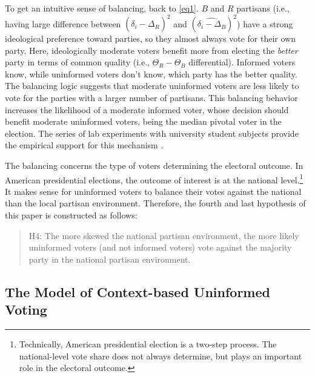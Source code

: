 \documentclass[letterpaper, 12pt]{article}
\begin{document}
    \par To get an intuitive sense of balancing, back to \autoref{eq1}. $B$ and $R$ partisans (i.e., having large difference between $\left(\widehat{\delta_i-\Delta_{R}}\right)^2$ and $\left(\widehat{\delta_i-\Delta_{B}}\right)^2$) have a strong ideological preference toward parties, so they almost always vote for their own party. Here, ideologically moderate voters benefit more from electing the \textit{better} party in terms of common quality (i.e., $\Theta_{R} - \Theta_{B}$ differential). Informed voters know, while uninformed voters don't know, which party has the better quality. The balancing logic suggests that moderate uninformed voters are less likely to vote for the parties with a larger number of partisans. This balancing behavior increases the likelihood of a moderate informed voter, whose decision should benefit moderate uninformed voters, being the median pivotal voter in the election. The series of lab experiments with university student subjects provide the empirical support for this mechanism \citep{Battaglini2008inag, Battaglini2010thsw}.
    
    \par The balancing concerns the type of voters determining the electoral outcome. In American presidential elections, the outcome of interest is at the national level.\footnote{Technically, American presidential election is a two-step process. The national-level vote share does not always determine, but plays an important role in the electoral outcome.} It makes sense for uninformed voters to balance their votes against the national than the local partisan environment. Therefore, the fourth and last hypothesis of this paper is constructed as follows:

    \begin{verse}
        H4: The more skewed the national partisan environment, the more likely uninformed voters (and not informed voters) vote against the majority party in the national partisan environment. 
    \end{verse}

    \subsection*{The Model of Context-based Uninformed Voting}
\end{document}
